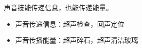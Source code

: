 \documentclass[windows,csize4]{BHCexam}
\begin{document}
\begin{groups}
    声音技能传递信息，也能传递能量。
    \begin{itemize}
        \item 声音传递信息：超声检查，回声定位
        \item 声音传播能量：超声碎石，超声清洁玻璃
    \end{itemize}

\end{groups}

\begin{groups}

\end{groups}

\label{lastpage}
\end{document}
